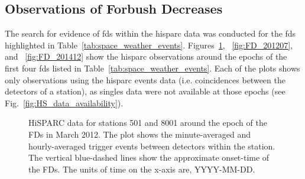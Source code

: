 \subsection{Observations of Forbush Decreases}


The search for evidence of \glspl{fd} within the \gls{hisparc} data was conducted for the \glspl{fd} highlighted in Table~\ref{tab:space_weather_events}. Figures~\ref{fig:FD_201203}, ~\ref{fig:FD_201207}, and ~\ref{fig:FD_201412} show the \gls{hisparc} observations around the epochs of the first four \glspl{fd} listed in Table~\ref{tab:space_weather_events}. Each of the plots shows only observations using the \gls{hisparc} events data (i.e. coincidences between the detectors of a station), as singles data were not available at those epochs (see Fig.~\ref{fig:HS_data_availability}).

\begin{figure}[ht!]
	\centering
	
	\caption{HiSPARC data for stations 501 and 8001 around the epoch of the FDs in March 2012. The plot shows the minute-averaged and hourly-averaged trigger events between detectors within the station. The vertical blue-dashed lines show the approximate onset-time of the FDs. The units of time on the x-axis are, YYYY-MM-DD.}
	\label{fig:FD_201203}
\end{figure}

